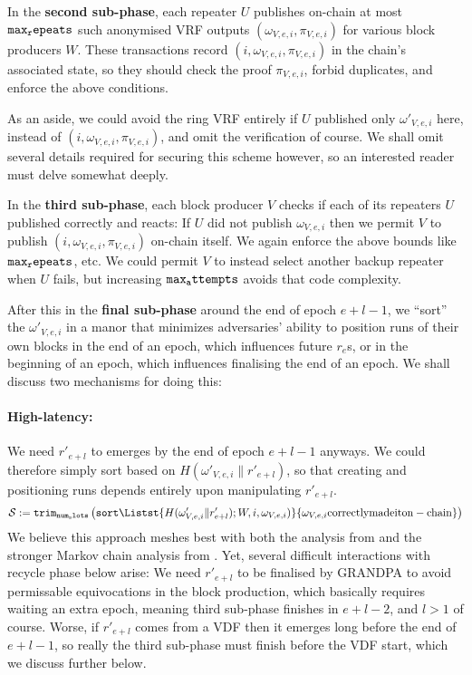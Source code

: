 In the {\bf second sub-phase}, each repeater $U$ publishes on-chain at most $\mathtt{max_repeats}$ such anonymised VRF outputs $(\omega_{V,e,i},\pi_{V,e,i})$ for various block producers $W$.  These transactions record $(i,\omega_{V,e,i},\pi_{V,e,i})$ in the chain's associated state, so they should check the proof $\pi_{V,e,i}$, forbid duplicates, and enforce the above conditions.

As an aside, we could avoid the ring VRF entirely if $U$ published only $\omega'_{V,e,i}$ here, instead of $(i,\omega_{V,e,i},\pi_{V,e,i})$, and omit the verification of course.  We shall omit several details required for securing this scheme however, so an interested reader must delve somewhat deeply.

In the {\bf third sub-phase}, each block producer $V$ checks if each of its repeaters $U$ published correctly and reacts:  If $U$ did not publish $\omega_{V,e,i}$ then we permit $V$ to publish $(i,\omega_{V,e,i},\pi_{V,e,i})$ on-chain itself.  We again enforce the above bounds like $\mathtt{max_repeats}$, etc.  We could permit $V$ to instead select another backup repeater when $U$ fails, but increasing $\mathtt{max_attempts}$ avoids that code complexity.

After this in the {\bf final sub-phase} around the end of epoch $e+l-1$, we ``sort'' the $\omega'_{V,e,i}$ in a manor that minimizes adversaries' ability to position runs of their own blocks in the end of an epoch, which influences future $r_e$s, or in the beginning of an epoch, which influences finalising the end of an epoch.  We shall discuss two mechanisms for doing this: 

\paragraph{High-latency:} 
We need $r'_{e+l}$ to emerges by the end of epoch $e+l-1$ anyways.  We could therefore simply sort based on $H(\omega'_{V,e,i} \| r'_{e+l})$, so that creating and positioning runs depends entirely upon manipulating $r'_{e+l}$. 
$$ \mathcal{S} := \mathtt{trim}_\vrfaslotsbound\left( \mathtt{sort} \Listst{
  H(\omega'_{V,e,i} \| r'_{e+l}); W,i,\omega_{V,e,i}) 
}{
  \omega_{V,e,i} \mathrm{ correctly made it on-chain}
} \right) $$
We believe this approach meshes best with both the analysis from \cite{Praos} and the stronger Markov chain analysis from \cite{Kiffer18}.  Yet, several difficult interactions with recycle phase below arise:  We need $r'_{e+l}$ to be finalised by GRANDPA to avoid permissable equivocations in the block production, which basically requires waiting an extra epoch, meaning third sub-phase finishes in $e+l-2$, and $l>1$ of course.  Worse, if $r'_{e+l}$ comes from a VDF then it emerges long before the end of $e+l-1$, so really the third sub-phase must finish before the VDF start, which we discuss further below.

